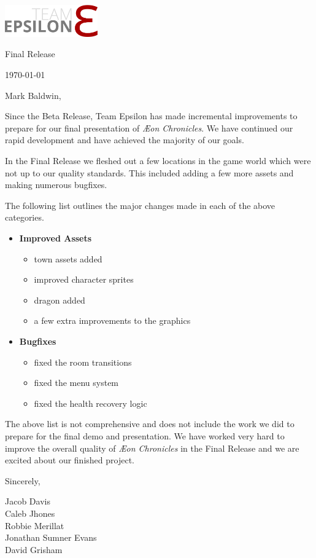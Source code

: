 \documentclass[12pt]{article}
\newcommand\aeon{\textit{\AE on Chronicles}\xspace}
\newcommand\tab[1][.5in]{\hspace*{#1}}
\newcommand\releasename{Final Release\xspace}
\newcommand\te{Team Epsilon\xspace}
\begin{document}
\hfill\includegraphics[width=4cm]{../graphics/logo/team-epsilon-light-cropped}

\hfill \releasename

\hfill \today

Mark Baldwin,

Since the Beta Release, \te has made incremental improvements to prepare for our
final presentation of \aeon. We have continued our rapid development and have
achieved the majority of our goals.

In the \releasename we fleshed out a few locations in the game world which were
not up to our quality standards. This included adding a few more assets and
making numerous bugfixes.

The following list outlines the major changes made in each of the above
categories.

\begin{itemize}
    \item \textbf{Improved Assets}
        \begin{itemize}[noitemsep]
            \item town assets added
            \item improved character sprites
            \item dragon added
            \item a few extra improvements to the graphics
        \end{itemize}

    \item \textbf{Bugfixes}
        \begin{itemize}[noitemsep]
            \item fixed the room transitions
            \item fixed the menu system
            \item fixed the health recovery logic
        \end{itemize}
\end{itemize}

The above list is not comprehensive and does not include the work we did to
prepare for the final demo and presentation. We have worked very hard to improve
the overall quality of \aeon in the \releasename and we are excited about our
finished project.

Sincerely,

\tab Jacob Davis \\
\tab Caleb Jhones \\
\tab Robbie Merillat \\
\tab Jonathan Sumner Evans \\
\tab David Grisham \\
\end{document}
